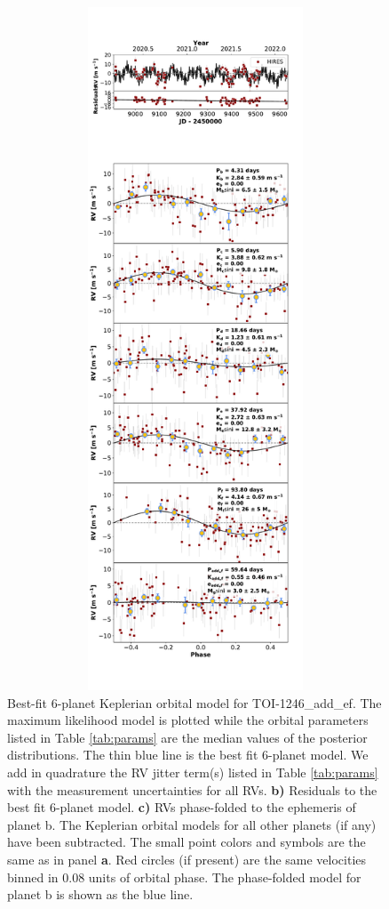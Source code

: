 \documentclass{emulateapj}
\begin{document}
\begin{figure}[!h]
\centering 

\includegraphics[height=8.0in,width=6.0in,keepaspectratio]{TOI-1246_add_ef_rv_multipanel.pdf}
\caption{ Best-fit 6-planet Keplerian orbital model
  for TOI-1246\_add\_ef. The maximum likelihood model is plotted while
  the orbital parameters listed in Table \ref{tab:params} are the
  median values of the posterior distributions.  The thin blue line is
  the best fit 6-planet model. We add in quadrature
  the RV jitter term(s) listed in Table \ref{tab:params} with the
  measurement uncertainties for all RVs.  {\bf b)} Residuals to the
  best fit 6-planet model. {\bf c)} RVs phase-folded
  to the ephemeris of planet b. The Keplerian orbital models for all
  other planets (if any) have been subtracted.  The small point colors
  and symbols are the same as in panel {\bf a}.  Red circles (if
  present) are the same velocities binned in 0.08 units of orbital
  phase.  The phase-folded model for planet b is shown as the blue
  line.}
\end{figure}
 
\end{document}

